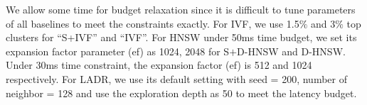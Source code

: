 We allow some time for budget relaxation since it is difficult to tune parameters of all baselines to meet the constraints exactly. 
For IVF, we use 1.5$\%$ and 3$\%$ top clusters for ``S+IVF'' and ``IVF''.
For HNSW under 50ms time budget, we set its expansion factor parameter (ef) as 1024, 
2048 for S$+$D-HNSW and D-HNSW. 
Under 30ms time constraint, the expansion factor (ef) is  512 and  1024 respectively. 
For LADR, we use its default setting with seed = 200, number of neighbor = 128 and use the exploration depth as  50 to meet the latency budget.
